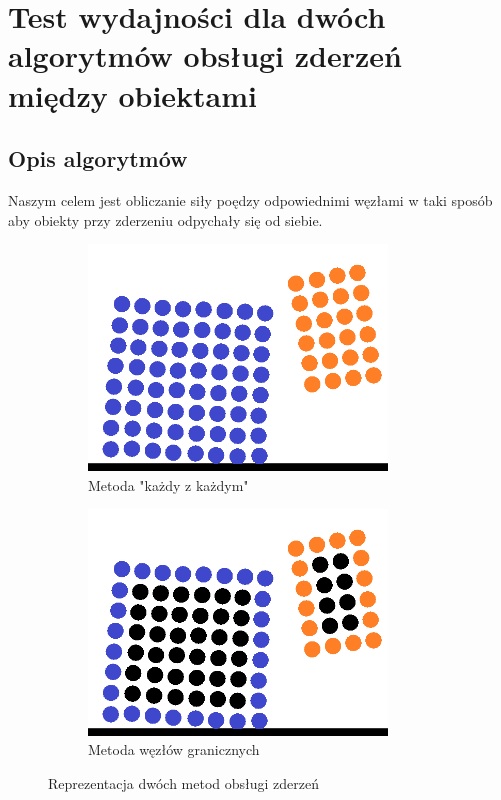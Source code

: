 \documentclass[12pt, letterpaper]{report}
\begin{document}
    \section{Test wydajności dla dwóch algorytmów obsługi zderzeń między obiektami}
    \subsection{Opis algorytmów}
    Naszym celem jest obliczanie siły poędzy odpowiednimi węzłami w taki sposób aby 
    obiekty przy zderzeniu odpychały się od siebie.
    
    \begin{figure}[h]

        \begin{subfigure}{0.5\textwidth}
        \includegraphics[width=0.9\linewidth, height=6cm]{objects_unoptimized} 
        \caption{Metoda "każdy z każdym"}
        \label{fig:subim1}
        \end{subfigure}
        \begin{subfigure}{0.5\textwidth}
        \includegraphics[width=0.9\linewidth, height=6cm]{objects_optimized}
        \caption{Metoda węzłów granicznych}
        \label{fig:subim2}
        \end{subfigure}
        
        \caption{Reprezentacja dwóch metod obsługi zderzeń}
        \label{fig:image2}
    \end{figure}
\end{document}
